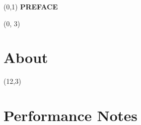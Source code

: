 \documentclass[10pt]{article}
\begin{document}
\begin{textblock}{23}(0,1)
    \center\huge\textbf{PREFACE}
\end{textblock}

\begin{textblock}{11}(0, 3)

\section{About}

\end{textblock}

\begin{textblock}{11}(12,3)

\section{Performance Notes}

\end{textblock}
\end{document}
